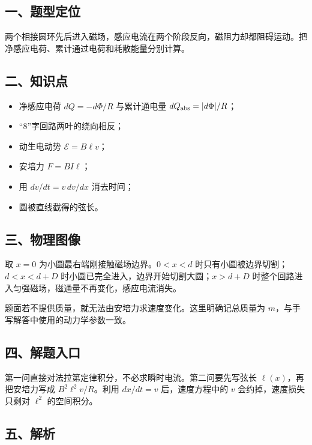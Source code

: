\documentclass[12pt,a4paper,UTF8]{ctexart}
\newcommand{\tightlist}{\setlength{\itemsep}{0pt}\setlength{\parskip}{0pt}}
\begin{document}
\subsection{一、题型定位}\label{ux4e00ux9898ux578bux5b9aux4f4d-3}

两个相接圆环先后进入磁场，感应电流在两个阶段反向，磁阻力却都阻碍运动。把净感应电荷、累计通过电荷和耗散能量分别计算。

\subsection{二、知识点}\label{ux4e8cux77e5ux8bc6ux70b9-3}

\begin{itemize}
\tightlist
\item
  净感应电荷 \(dQ=-d\Phi/R\) 与累计通电量 \(dQ_{\rm abs}=|d\Phi|/R\)；
\item
  ``8''字回路两叶的绕向相反；
\item
  动生电动势 \(\mathcal E=B\ell v\)；
\item
  安培力 \(F=B I\ell\)；
\item
  用 \(dv/dt=v\,dv/dx\) 消去时间；
\item
  圆被直线截得的弦长。
\end{itemize}

\subsection{三、物理图像}\label{ux4e09ux7269ux7406ux56feux50cf-3}

取 \(x=0\) 为小圆最右端刚接触磁场边界。\(0<x<d\)
时只有小圆被边界切割；\(d<x<d+D\)
时小圆已完全进入，边界开始切割大圆；\(x>d+D\)
时整个回路进入匀强磁场，磁通量不再变化，感应电流消失。

题面若不提供质量，就无法由安培力求速度变化。这里明确记总质量为
\(m\)，与手写解答中使用的动力学参数一致。

\subsection{四、解题入口}\label{ux56dbux89e3ux9898ux5165ux53e3-3}

第一问直接对法拉第定律积分，不必求瞬时电流。第二问要先写弦长
\(\ell(x)\)，再把安培力写成 \(B^2\ell^2v/R\)。利用 \(dx/dt=v\)
后，速度方程中的 \(v\) 会约掉，速度损失只剩对 \(\ell^2\) 的空间积分。

\subsection{五、解析}\label{ux4e94ux89e3ux6790-3}
\end{document}
